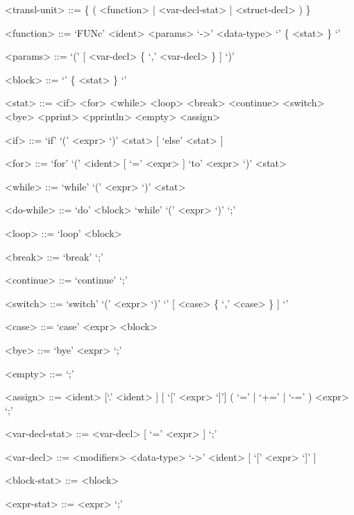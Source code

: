 \documentclass[12pt, a4paper]{article}
\begin{document}
    \setlength{\grammarparsep}{0.6em} %
    \setlength{\grammarindent}{10em} %

    \begin{grammar}

        <transl-unit> ::= \{ ( <function> | <var-decl-stat> | <struct-decl> ) \}

        <function> ::= `FUNc' <ident> <params> `->' <data-type> `{'  \{ <stat> \} `}'

        <params> ::= `(' [ <var-decl> \{ `,' <var-decl> \} ] `)'

        <block> ::= `{'  \{ <stat> \} `}'

        <stat> ::= <if>
        \alt <for>
        \alt <while>
        \alt <loop>
        \alt <break>
        \alt <continue>
        \alt <switch>
        \alt <bye>
        \alt <pprint>
        \alt <pprintln>
        \alt <empty>
        \alt <assign>

        <if> ::= `if' `(' <expr> `)' <stat> [ `else' <stat> ]

        <for> ::= `for' `(' <ident> [ `=' <expr> ] `to' <expr> `)' <stat>

        <while> ::= `while' `(' <expr> `)' <stat>

        <do-while> ::= `do' <block> `while' `(' <expr> `)' `;'

        <loop> ::= `loop' <block>

        <break> ::= `break' `;'

        <continue> ::= `continue' `;'

        <switch> ::= `switch' `(' <expr> `)' `{' [ <case> \{ `,' <case> \} ] `}'

        <case> ::= `case' <expr> <block>

        <bye> ::= `bye' <expr> `;'

        <empty> ::= `;'

        <assign> ::= <ident> [`.' <ident> ] [ `[' <expr> `]'] ( `=' | `+=' | `-=' ) <expr> `;'

        <var-decl-stat> ::= <var-decl> [ `=' <expr> ] `;'

        <var-decl> ::= <modifiers> <data-type> `->' <ident> [ `[' <expr> `]' ]

        <block-stat> ::= <block>

        <expr-stat> ::= <expr> `;'


\end{grammar}
\end{document}
